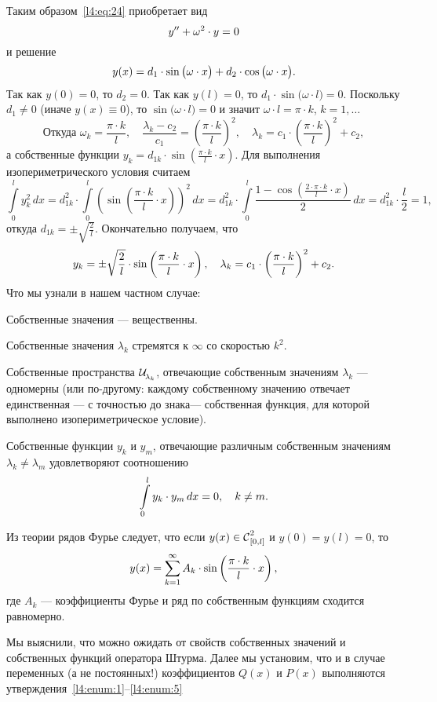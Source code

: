 Таким образом~\eqref{l4:eq:24} приобретает вид
\begin{equation*}
	\hfill y''+\omega^2\cdot y=0\hfill
\end{equation*}  
и решение
\begin{equation*}
	\hfill y(x)=d_1\cdot\sin\big(\omega\cdot x\big)+d_2\cdot\cos\big(\omega\cdot x\big).\hfill
\end{equation*}
Так как $y(0)=0$, то $d_2=0$. Так как $y(l)=0$, то $d_1\cdot\sin\big(\omega\cdot l\big)=0$. Поскольку $d_1\neq0$ (иначе $y(x)\equiv0$), то $\sin\big(\omega\cdot l\big)=0$ и значит $\omega\cdot l=\pi\cdot k$, $k=1,\ldots$ 
\begin{equation*}
	\text{Откуда }\omega_k=\frac{\pi\cdot k}{l},\quad \frac{\lambda_k-c_2}{c_1}=\left(\frac{\pi\cdot k}{l}\right)^2,\quad\lambda_k=c_1\cdot\left(\frac{\pi\cdot k}{l}\right)^2+c_2,
\end{equation*}
а собственные функции $y_k=d_{1k}\cdot\sin\left(\frac{\pi\cdot k}{l}\cdot x\right)$. Для выполнения изопериметрического условия считаем
\begin{equation*}
	\int\limits_0^l y_k^2\,dx=d_{1k}^2\cdot\int\limits_0^l\left(\sin\left(\frac{\pi\cdot k}{l}\cdot x\right)\right)^2\,dx=d_{1k}^2\cdot\int\limits_0^l\frac{1-\cos\left(\frac{2\cdot\pi\cdot k}{l}\cdot x\right)}{2}\,dx=d_{1k}^2\cdot\frac{l}{2}=1,
\end{equation*}
откуда $d_{1k}=\pm\displaystyle\sqrt{\frac{2}{l}}$. Окончательно получаем, что
\begin{equation*}
	\hfill y_k=\pm\sqrt{\frac{2}{l}}\cdot\sin\left(\frac{\pi\cdot k}{l}\cdot x\right),\quad\lambda_k=c_1\cdot\left(\frac{\pi\cdot k}{l}\right)^2+c_2.\hfill
\end{equation*}
Что мы узнали в нашем частном случае:
\begin{enumerateD}
	\item\label{l4:enum:1} Собственные значения --- вещественны.
	\item Собственные значения $\lambda_k$ стремятся к $\infty$ со скоростью $k^2$.
	\item Собственные пространства $\displaystyle \Ul[\lambda_k]$, отвечающие собственным значениям $\lambda_k$ --- одномерны (или по-другому: каждому собственному значению отвечает единственная --- с точностью до знака--- собственная функция, для которой выполнено изопериметрическое условие).
	\item Собственные функции $y_k$ и $y_m$, отвечающие различным собственным значениям $\lambda_k\neq\lambda_m$ удовлетворяют соотношению
	\begin{equation*}
		\hfill\int\limits_0^l y_k\cdot y_m\,dx=0,\quad k\neq m.\hfill
	\end{equation*}
	\item\label{l4:enum:5} Из теории рядов Фурье следует, что если $y(x)\in\Cfn[{[0,l]}]{2}$ и $y(0)=y(l)=0$, то 
	\begin{equation*}
		\hfill y(x)=\sum\limits_{k=1}^{\infty} A_k\cdot\sin\left(\frac{\pi\cdot k}{l}\cdot x\right),\hfill
	\end{equation*}
	где $A_k$ --- коэффициенты Фурье и ряд по собственным функциям сходится равномерно. 
\end{enumerateD}

Мы выяснили, что можно ожидать от свойств собственных значений и собственных функций оператора Штурма. Далее мы установим, что и в случае переменных (а не постоянных!) коэффициентов $Q(x)$ и $P(x)$ выполняются утверждения~\ref{l4:enum:1}--\ref{l4:enum:5}